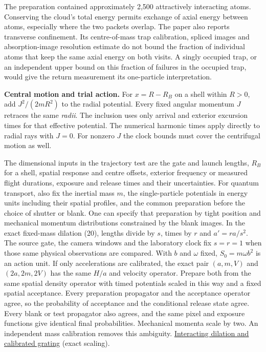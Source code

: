 \documentclass[11pt,a4paper]{article}
\begin{document}
The preparation contained approximately 2,500 attractively interacting
atoms. Conserving the cloud's total energy permits exchange of axial
energy between atoms, especially where the two packets overlap. The
paper also reports transverse confinement. Its centre-of-mass trap
calibration, spliced images and absorption-image resolution estimate do
not bound the fraction of individual atoms that keep the same axial
energy on both visits. A singly occupied trap, or an independent upper
bound on this fraction of failures in the occupied trap, would give the
return measurement its one-particle interpretation.

\textbf{Central motion and trial action.} For \(x=R-R_B\) on a shell
within \(R>0\), add \(J^2/(2mR^2)\) to the radial potential. Every fixed
angular momentum \(J\) retraces the same \emph{radii}. The inclusion
uses only arrival and exterior excursion times for that effective
potential. The numerical harmonic times apply directly to radial rays
with \(J=0\). For nonzero \(J\) the clock bounds must cover the
centrifugal motion as well.

The dimensional inputs in the trajectory test are the gate and launch
lengths, \(R_B\) for a shell, spatial response and centre offsets,
exterior frequency or measured flight durations, exposure and release
times and their uncertainties. For quantum transport, also fix the
inertial mass \(m\), the single-particle potentials in energy units
including their spatial profiles, and the common preparation before the
choice of shutter or blank. One can specify that preparation by tight
position and mechanical momentum distributions constrained by the blank
images. In the exact fixed-mass dilation (20), lengths divide by \(s\),
times by \(r\) and \(a'=ra/s^2\). The source gate, the camera windows
and the laboratory clock fix \(s=r=1\) when those same physical
observations are compared. With \(b\) and \(\omega\) fixed,
\(S_0=m\omega b^2\) is an action unit. If only accelerations are
calibrated, the exact pair \((a,m,V)\) and \((2a,2m,2V)\) has the same
\(H/a\) and velocity operator. Prepare both from the same spatial
density operator with timed potentials scaled in this way and a fixed
spatial acceptance. Every preparation propagator and the acceptance
operator agree, so the probability of acceptance and the conditional
release state agree. Every blank or test propagator also agrees, and the
same pixel and exposure functions give identical final probabilities.
Mechanical momenta scale by two. An independent mass calibration removes
this ambiguity.
\href{groupoid-quantum-newton-states.md\#9-action-calibration-with-a-clocked-grating}{Interacting
dilation and calibrated grating} (exact scaling).
\end{document}

